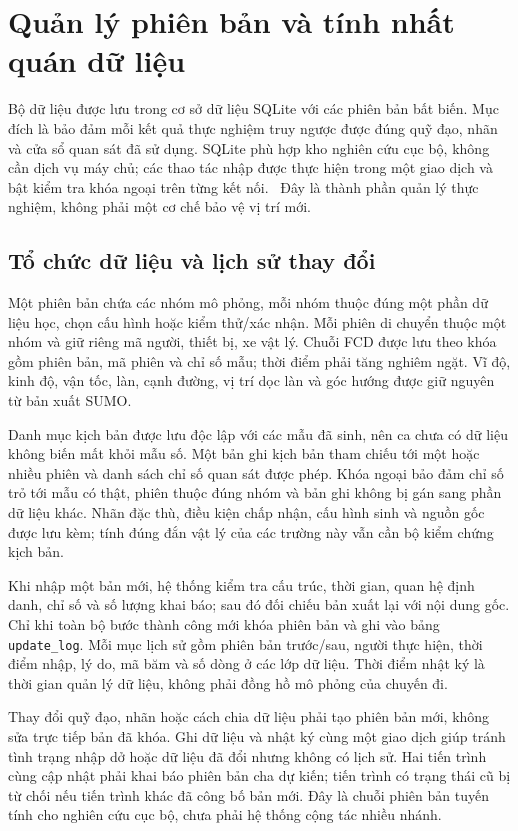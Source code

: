 \clearpage
\section{Quản lý phiên bản và tính nhất quán dữ liệu}
\label{sec:dataset-registry}

Bộ dữ liệu được lưu trong cơ sở dữ liệu SQLite với các phiên bản bất biến. Mục đích là bảo đảm mỗi kết quả thực nghiệm truy ngược được đúng quỹ đạo, nhãn và cửa sổ quan sát đã sử dụng. SQLite phù hợp kho nghiên cứu cục bộ, không cần dịch vụ máy chủ; các thao tác nhập được thực hiện trong một giao dịch và bật kiểm tra khóa ngoại trên từng kết nối.~\citep{sqlitetransactions,sqliteforeignkeys,sqliteuses} Đây là thành phần quản lý thực nghiệm, không phải một cơ chế bảo vệ vị trí mới.

\subsection{Tổ chức dữ liệu và lịch sử thay đổi}

Một phiên bản chứa các nhóm mô phỏng, mỗi nhóm thuộc đúng một phần dữ liệu học, chọn cấu hình hoặc kiểm thử/xác nhận. Mỗi phiên di chuyển thuộc một nhóm và giữ riêng mã người, thiết bị, xe vật lý. Chuỗi FCD được lưu theo khóa gồm phiên bản, mã phiên và chỉ số mẫu; thời điểm phải tăng nghiêm ngặt. Vĩ độ, kinh độ, vận tốc, làn, cạnh đường, vị trí dọc làn và góc hướng được giữ nguyên từ bản xuất SUMO.

Danh mục kịch bản được lưu độc lập với các mẫu đã sinh, nên ca chưa có dữ liệu không biến mất khỏi mẫu số. Một bản ghi kịch bản tham chiếu tới một hoặc nhiều phiên và danh sách chỉ số quan sát được phép. Khóa ngoại bảo đảm chỉ số trỏ tới mẫu có thật, phiên thuộc đúng nhóm và bản ghi không bị gán sang phần dữ liệu khác. Nhãn đặc thù, điều kiện chấp nhận, cấu hình sinh và nguồn gốc được lưu kèm; tính đúng đắn vật lý của các trường này vẫn cần bộ kiểm chứng kịch bản.

Khi nhập một bản mới, hệ thống kiểm tra cấu trúc, thời gian, quan hệ định danh, chỉ số và số lượng khai báo; sau đó đối chiếu bản xuất lại với nội dung gốc. Chỉ khi toàn bộ bước thành công mới khóa phiên bản và ghi vào bảng \texttt{update\_log}. Mỗi mục lịch sử gồm phiên bản trước/sau, người thực hiện, thời điểm nhập, lý do, mã băm và số dòng ở các lớp dữ liệu. Thời điểm nhật ký là thời gian quản lý dữ liệu, không phải đồng hồ mô phỏng của chuyến đi.

Thay đổi quỹ đạo, nhãn hoặc cách chia dữ liệu phải tạo phiên bản mới, không sửa trực tiếp bản đã khóa. Ghi dữ liệu và nhật ký cùng một giao dịch giúp tránh tình trạng nhập dở hoặc dữ liệu đã đổi nhưng không có lịch sử. Hai tiến trình cùng cập nhật phải khai báo phiên bản cha dự kiến; tiến trình có trạng thái cũ bị từ chối nếu tiến trình khác đã công bố bản mới. Đây là chuỗi phiên bản tuyến tính cho nghiên cứu cục bộ, chưa phải hệ thống cộng tác nhiều nhánh.

